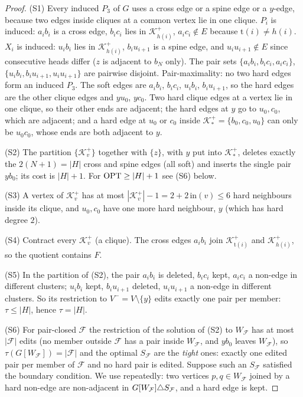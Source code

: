 \begin{proof}
(S1) Every induced $P_3$ of $G$ uses a cross edge or a spine edge or a $y$-edge, because two edges inside cliques at a common vertex lie in one clique. $P_i$ is induced: $a_ib_i$ is a cross edge, $b_ic_i$ lies in $\mathcal K^+_{h(i)}$, $a_ic_i\notin E$ because $\mathrm t(i)\ne h(i)$. $X_i$ is induced: $u_ib_i$ lies in $\mathcal K^+_{h(i)}$, $b_iu_{i+1}$ is a spine edge, and $u_iu_{i+1}\notin E$ since consecutive heads differ ($z$ is adjacent to $b_N$ only). The pair sets $\{a_ib_i,b_ic_i,a_ic_i\}$, $\{u_ib_i,b_iu_{i+1},u_iu_{i+1}\}$ are pairwise disjoint. Pair-maximality: no two hard edges form an induced $P_3$. The soft edges are $a_ib_i$, $b_ic_i$, $u_ib_i$, $b_iu_{i+1}$, so the hard edges are the other clique edges and $yu_0$, $yc_0$. Two hard clique edges at a vertex lie in one clique, so their other ends are adjacent; the hard edges at $y$ go to $u_0,c_0$, which are adjacent; and a hard edge at $u_0$ or $c_0$ inside $\mathcal K_*^+=\{b_0,c_0,u_0\}$ can only be $u_0c_0$, whose ends are both adjacent to $y$.

(S2) The partition $\{\mathcal K_v^+\}$ together with $\{z\}$, with $y$ put into $\mathcal K_*^+$, deletes exactly the $2(N+1)=|H|$ cross and spine edges (all soft) and inserts the single pair $yb_0$; its cost is $|H|+1$. For $\mathrm{OPT}\ge|H|+1$ see (S6) below.

(S3) A vertex of $\mathcal K_v^+$ has at most $|\mathcal K_v^+|-1=2+2\,\mathrm{in}(v)\le6$ hard neighbours inside its clique, and $u_0,c_0$ have one more hard neighbour, $y$ (which has hard degree $2$).

(S4) Contract every $\mathcal K_v^+$ (a clique). The cross edges $a_ib_i$ join $\mathcal K^+_{\mathrm t(i)}$ and $\mathcal K^+_{h(i)}$, so the quotient contains $F$.

(S5) In the partition of (S2), the pair $a_ib_i$ is deleted, $b_ic_i$ kept, $a_ic_i$ a non-edge in different clusters; $u_ib_i$ kept, $b_iu_{i+1}$ deleted, $u_iu_{i+1}$ a non-edge in different clusters. So its restriction to $V^-=V\setminus\{y\}$ edits exactly one pair per member: $\tau\le|H|$, hence $\tau=|H|$.

(S6) For pair-closed $\mathcal F$ the restriction of the solution of (S2) to $W_{\mathcal F}$ has at most $|\mathcal F|$ edits (no member outside $\mathcal F$ has a pair inside $W_{\mathcal F}$, and $yb_0$ leaves $W_{\mathcal F}$), so $\tau(G[W_{\mathcal F}])=|\mathcal F|$ and the optimal $S_{\mathcal F}$ are the \emph{tight} ones: exactly one edited pair per member of $\mathcal F$ and no hard pair is edited. Suppose such an $S_{\mathcal F}$ satisfied the boundary condition. We use repeatedly: two vertices $p,q\in W_{\mathcal F}$ joined by a hard non-edge are non-adjacent in $G[W_{\mathcal F}]\triangle S_{\mathcal F}$, and a hard edge is kept.


\end{proof}
